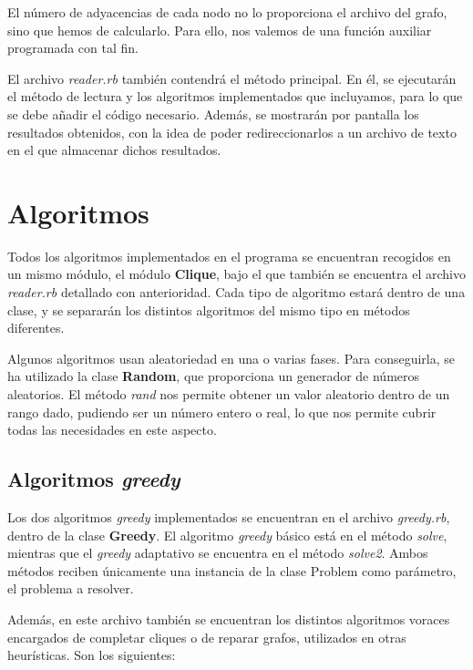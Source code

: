 El número de adyacencias de cada nodo no lo proporciona el archivo del grafo,
sino que hemos de calcularlo. Para ello, nos valemos de una función auxiliar
programada con tal fin.

El archivo \textit{reader.rb} también contendrá el método principal. En él, se
ejecutarán el método de lectura y los algoritmos implementados que incluyamos,
para lo que se debe añadir el código necesario. Además, se mostrarán por pantalla
los resultados obtenidos, con la idea de poder redireccionarlos a un archivo de
texto en el que almacenar dichos resultados.


\section{Algoritmos}

Todos los algoritmos implementados en el programa se encuentran recogidos en
un mismo módulo, el módulo \textbf{Clique}, bajo el que también se encuentra el
archivo \textit{reader.rb} detallado con anterioridad. Cada tipo de algoritmo
estará dentro de una clase, y se separarán los distintos algoritmos del mismo
tipo en métodos diferentes.

Algunos algoritmos usan aleatoriedad en una o varias fases. Para conseguirla, se
ha utilizado la clase \textbf{Random}, que proporciona un generador de números
aleatorios. El método \textit{rand} nos permite obtener un valor aleatorio
dentro de un rango dado, pudiendo ser un número entero o real, lo que nos permite
cubrir todas las necesidades en este aspecto.


\subsection{Algoritmos \textit{greedy}}

Los dos algoritmos \textit{greedy} implementados se encuentran en el archivo
\textit{greedy.rb}, dentro de la clase \textbf{Greedy}. El algoritmo \textit{greedy}
básico está en el método \textit{solve}, mientras que el \textit{greedy} adaptativo
se encuentra en el método \textit{solve2}. Ambos métodos reciben únicamente una
instancia de la clase Problem como parámetro, el problema a resolver.

Además, en este archivo también se encuentran los distintos algoritmos voraces
encargados de completar cliques o de reparar grafos, utilizados en otras heurísticas.
Son los siguientes:

